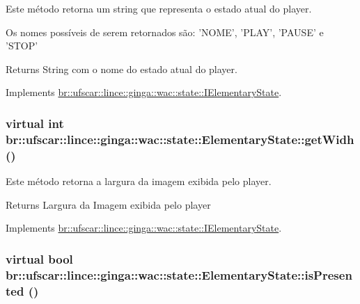 Este método retorna um string que representa o estado atual do player. 

Os nomes possíveis de serem retornados são: 'NOME', 'PLAY', 'PAUSE' e 'STOP' \begin{DoxyReturn}{Returns}
String com o nome do estado atual do player. 
\end{DoxyReturn}


Implements \hyperlink{classbr_1_1ufscar_1_1lince_1_1ginga_1_1wac_1_1state_1_1IElementaryState_abeabe720e157120f97d6a911460f6d71}{br::ufscar::lince::ginga::wac::state::IElementaryState}.

\hypertarget{classbr_1_1ufscar_1_1lince_1_1ginga_1_1wac_1_1state_1_1ElementaryState_adf39d11c81458c2b636b797821a81fc3}{
\subsubsection[{getWidh}]{\setlength{\rightskip}{0pt plus 5cm}virtual int br::ufscar::lince::ginga::wac::state::ElementaryState::getWidh ()}}
\label{classbr_1_1ufscar_1_1lince_1_1ginga_1_1wac_1_1state_1_1ElementaryState_adf39d11c81458c2b636b797821a81fc3}


Este método retorna a largura da imagem exibida pelo player. 

\begin{DoxyReturn}{Returns}
Largura da Imagem exibida pelo player 
\end{DoxyReturn}


Implements \hyperlink{classbr_1_1ufscar_1_1lince_1_1ginga_1_1wac_1_1state_1_1IElementaryState_a13218fa1e799a3aabc8f20ffd7c134f5}{br::ufscar::lince::ginga::wac::state::IElementaryState}.

\hypertarget{classbr_1_1ufscar_1_1lince_1_1ginga_1_1wac_1_1state_1_1ElementaryState_ab247813eed9444dfb53c59235b1f91a9}{
\subsubsection[{isPresented}]{\setlength{\rightskip}{0pt plus 5cm}virtual bool br::ufscar::lince::ginga::wac::state::ElementaryState::isPresented ()}}
\label{classbr_1_1ufscar_1_1lince_1_1ginga_1_1wac_1_1state_1_1ElementaryState_ab247813eed9444dfb53c59235b1f91a9}



